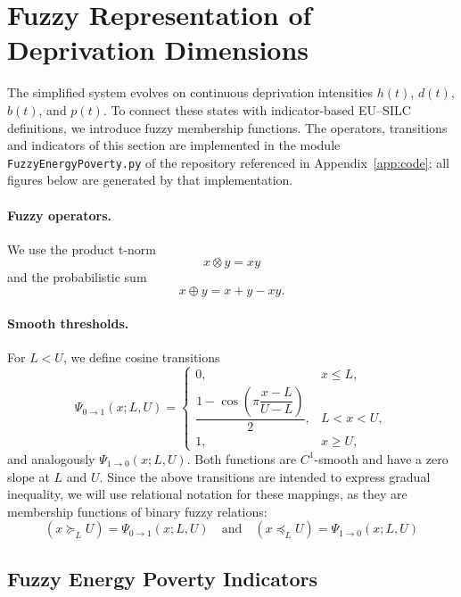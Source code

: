 \documentclass[11pt,a4paper]{article}
\begin{document}


\section{Fuzzy Representation of Deprivation Dimensions}\label{sec:fuzzy}

The simplified system evolves on continuous deprivation intensities
$h(t)$, $d(t)$, $b(t)$, and $p(t)$. To connect these states with indicator-based
EU--SILC definitions, we introduce fuzzy membership functions. The operators,
transitions and indicators of this section are implemented in the module
\texttt{FuzzyEnergyPoverty.py} of the repository referenced in
Appendix~\ref{app:code}; all figures below are generated by that
implementation.

\paragraph{Fuzzy operators.}
We use the product t-norm
\[
x\otimes y = xy
\]
and the probabilistic sum
\[
x\oplus y = x+y-xy.
\]

\paragraph{Smooth thresholds.}
For $L<U$, we define cosine transitions
\begin{equation}\label{eq:costransition}
\Psi_{0\to1}(x;L,U)=
\begin{cases}
0,&x\le L,\\
\dfrac{1-\cos\!\left(\pi\dfrac{x-L}{U-L}\right)}{2},&L<x<U,\\
1,&x\ge U,
\end{cases}
\end{equation}
and analogously $\Psi_{1\to0}(x;L,U)$. Both functions are $C^1$-smooth and have a zero slope at $L$ and $U$.  Since the above transitions are intended to express gradual inequality, we will use relational notation for these mappings, as they are membership functions of binary fuzzy relations:
\begin{equation}\label{def:fuzzyineq}
(x\succeq_LU)=\Psi_{0\to1}(x;L,U)
\quad\text{and}\quad (x\preceq_LU)=\Psi_{1\to0}(x;L,U)
\end{equation}


\subsection{Fuzzy Energy Poverty Indicators}
\end{document}
